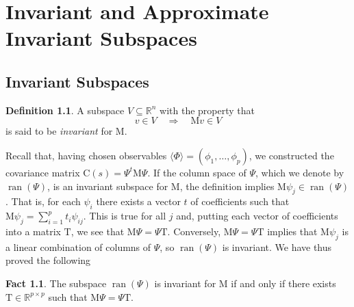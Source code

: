 \documentclass[12pt,letterpaper]{report}
\theoremstyle{plain}
\theoremstyle{definition}
\newtheorem{definition}[theorem]{Definition}
\newtheorem{fact}{Fact}[chapter]
\theoremstyle{remark}
\numberwithin{theorem}{chapter}
\numberwithin{claim}{chapter}
\numberwithin{equation}{chapter}
\numberwithin{conjecture}{chapter}
\newcommand\R{\ensuremath{\mathbb{R}}}
\newcommand\C{\ensuremath{\mathrm{C}}}
\newcommand\M{\ensuremath{\mathrm{M}}}
\newcommand\T{\ensuremath{\mathrm{T}}}
\newcommand\ran{\ensuremath{\operatorname{ran}}}
\newcommand\<{\ensuremath{\langle}}
\renewcommand\>{\ensuremath{\rangle}}
\begin{document}
\chapter{Invariant and Approximate Invariant Subspaces}
\label{cha:invar-appr-invar}
\section{Invariant Subspaces}

\begin{definition}
A subspace $V \subseteq \R^n$ with the property that
\[
v\in V \quad \Longrightarrow \quad \M v \in V
\]
is said to be \emph{invariant} for $\M$.
\end{definition}

Recall that, having chosen observables $\<\Phi\> = (\phi_1, \dots, \phi_p)$, we
constructed the covariance matrix 
$\C(s) = \Psi^t \M \Psi$. 
If the column space of $\Psi$, which we denote by $\ran(\Psi)$, is an invariant
subspace for $\M$, the definition implies $\M\psi_j \in \ran(\Psi)$.
That is, for each $\psi_i$ there exists a vector
$t$ of coefficients such that $\M \psi_j = \sum_{i=1}^p t_i \psi_{ij}$. 
This is true for all $j$ and, putting each vector of
coefficients into a matrix $\T$, we see that 
$\M \Psi = \Psi \T$. Conversely, $\M\Psi = \Psi \T$ implies that $\M\psi_j$ is a
linear combination of columns of $\Psi$, so $\ran(\Psi)$ is invariant. We have
thus proved the following 
\begin{fact}
\label{fact:3.1.1}
The subspace $\ran(\Psi)$ is invariant for $\M$ if and only if there exists 
$\T \in \R^{p\times p}$ such that $\M\Psi = \Psi \T$.
\end{fact}
\end{document}
